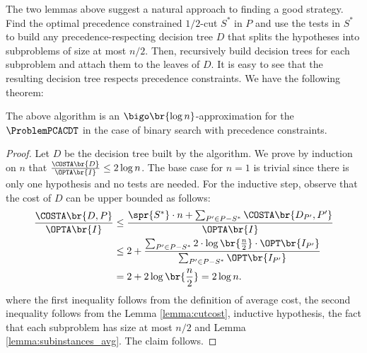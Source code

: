 The two lemmas above suggest a natural approach to finding a good strategy. Find the optimal precedence constrained $1/2$-cut $S^*$ in $P$ and use the tests in $S^*$ to build any precedence-respecting decision tree $D$ that splits the hypotheses into subproblems of size at most $n/2$. Then, recursively build decision trees for each subproblem and attach them to the leaves of $D$. It is easy to see that the resulting decision tree respects precedence constraints. We have the following theorem:
\begin{theorem}\label{thm:binary-search-approximation}
    The above algorithm is an $\bigo\br{\log n}$-approximation for the $\ProblemPCACDT$ in the case of binary search with precedence constraints.
\end{theorem}
\begin{proof}
    Let $D$ be the decision tree built by the algorithm. We prove by induction on $n$ that $\frac{\COSTA\br{D}}{\OPTA\br{I}}\leq 2\log n$. The base case for $n=1$ is trivial since there is only one hypothesis and no tests are needed. For the inductive step, observe that the cost of $D$ can be upper bounded as follows:
    \begin{align*}
        \frac{\COSTA\br{D, P}}{\OPTA\br{I}} &\leq \frac{\spr{S^*}\cdot n + \sum_{P'\in P-S^*}\COSTA\br{D_{P'}, P'}}{\OPTA\br{I}} 
        \\&\leq 2 + \frac{\sum_{P'\in P-S^*} 2\cdot \log\br{\frac{n}{2}}\cdot \OPT\br{I_{P'}}}{\sum_{P'\in P-S^*}\OPT\br{I_{P'}}} 
        \\&=
        2 + 2\log\br{\frac{n}{2}} = 2\log n.
    \end{align*}
    where the first inequality follows from the definition of average cost, the second inequality follows from the Lemma \ref{lemma:cutcost}, inductive hypothesis, the fact that each subproblem has size at most $n/2$ and Lemma \ref{lemma:subinstances_avg}. The claim follows.
\end{proof}
